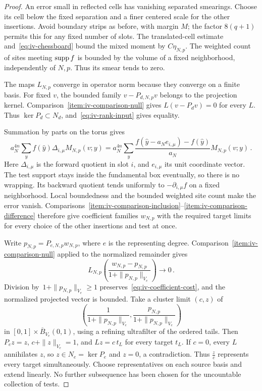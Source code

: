 \begin{proof}
An error small in reflected cells has vanishing separated smearings.
Choose its cell below the fixed separation and a finer centered scale for the other insertions.
Avoid boundary strips as before, with margin $M$; the factor $8(q+1)$ permits this for any fixed number of slots.
The translated-cell estimate and~\eqref{eq:iv-chessboard} bound the mixed moment by $C\eta_{N,p}$.
The weighted count of sites meeting $\operatorname{supp} f$ is bounded by the volume of a fixed neighborhood, independently of $N,p$.
Thus its smear tends to zero.

The maps $L_{N,p}$ converge in operator norm because they converge on a finite basis.
For fixed $v$, the bounded family $v-P_{d,N,p}v$ belongs to the projection kernel.
Comparison~\ref{item:iv-comparison-null} gives $L(v-P_dv)=0$ for every $L$.
Thus $\ker P_d\subset N_d$, and~\eqref{eq:iv-rank-input} gives equality.

Summation by parts on the torus gives
\begin{equation*}
a_N^{4n}\sum_y f(\widehat y)\Delta_{i,\mu}M_{N,p}(v;y)
=a_N^{4n}\sum_y\frac{f(\widehat y-a_Ne_{i,\mu})-f(\widehat y)}{a_N}M_{N,p}(v;y)\,.
\end{equation*}
Here $\Delta_{i,\mu}$ is the forward quotient in slot $i$, and $e_{i,\mu}$ its unit coordinate vector.
The test support stays inside the fundamental box eventually, so there is no wrapping.
Its backward quotient tends uniformly to $-\partial_{i,\mu}f$ on a fixed neighborhood.
Local boundedness and the bounded weighted site count make the error vanish.
Comparisons~\ref{item:iv-comparison-inclusion}--\ref{item:iv-comparison-difference} therefore give coefficient families $w_{N,p}$ with the required target limits for every choice of the other insertions and test at once.

Write $p_{N,p}=P_{e,N,p}w_{N,p}$, where $e$ is the representing degree.
Comparison~\ref{item:iv-comparison-null} applied to the normalized remainder gives
\begin{equation*}
L_{N,p}\left(\frac{w_{N,p}-p_{N,p}}{1+\|p_{N,p}\|_{V_e}}\right)\longrightarrow0\,.
\end{equation*}
Division by~$1+\|p_{N,p}\|_{V_e}\ge1$ preserves~\eqref{eq:iv-coefficient-cost}, and the normalized projected vector is bounded.
Take a cluster limit $(c,z)$ of
\begin{equation*}
\left(\frac{1}{1+\|p_{N,p}\|_{V_e}},\frac{p_{N,p}}{1+\|p_{N,p}\|_{V_e}}\right)
\end{equation*}
in $[0,1]\times\overline B_{V_e}(0,1)$, using a refining ultrafilter of the ordered tails.
Then $P_ez=z$, $c+\|z\|_{V_e}=1$, and $Lz=c\,t_L$ for every target $t_L$.
If $c=0$, every $L$ annihilates $z$, so $z\in N_e=\ker P_e$ and $z=0$, a contradiction.
Thus $\frac{z}{c}$ represents every target simultaneously.
Choose representatives on each source basis and extend linearly.
No further subsequence has been chosen for the uncountable collection of tests.
\end{proof}

